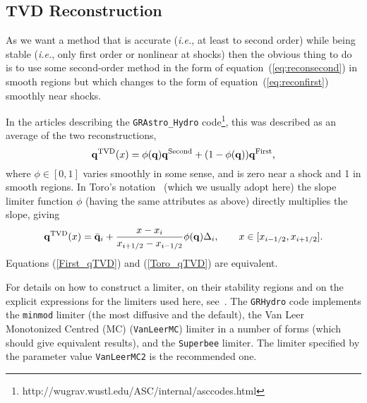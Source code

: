 \documentclass{article}
\begin{document}
\subsection{TVD Reconstruction}
\label{sec:tvd}

As we want a method that is accurate ({\it i.e.}, at least to second order)
while being stable ({\it i.e.}, only first order or nonlinear at shocks)
then the obvious thing to do is to use some second-order method in the
form of equation~(\ref{eq:reconsecond}) in smooth regions but which
changes to the form of equation~(\ref{eq:reconfirst}) smoothly near
shocks. 

In the articles describing the {\tt GRAstro\_Hydro}
code\footnote{http://wugrav.wustl.edu/ASC/internal/asccodes.html},
this was described as an average of the two reconstructions, 
\begin{equation}
  {\bf q}^{{\rm TVD}}(x) = \phi({\bf q}) {\bf q}^{{\rm Second}} + (1 -
  \phi({\bf q})) {\bf q}^{{\rm First}},
  \label{First_qTVD}
\end{equation}
where $\phi \in [0,1]$ varies smoothly in some sense, and is zero near
a shock and 1 in smooth regions. In Toro's notation~\cite{toro} (which we usually adopt here) 
the slope limiter function $\phi$ (having the same attributes as above)
directly multiplies the slope, giving
\begin{equation}
  {\bf q}^{{\rm TVD}}(x) = \bar{{\bf q}}_i + \frac{x -
  x_i}{x_{i+1/2} - x_{i-1/2}} \phi({\bf q}) \Delta_i, \qquad x \in [
  x_{i-1/2}, x_{i+1/2} ]. 
  \label{Toro_qTVD}
\end{equation}
Equations (\ref{First_qTVD}) and (\ref{Toro_qTVD}) are equivalent.

For details on how to construct a limiter, on their stability regions and on 
the explicit expressions for the limiters used here,
see~\cite{toro}. The {\tt GRHydro} code implements the {\tt minmod} limiter
(the most diffusive and the default), the Van Leer Monotonized Centred
(MC) ({\tt VanLeerMC}) limiter in a number of forms (which should give equivalent results), 
and the {\tt Superbee} limiter. The limiter specified by the parameter value {\tt VanLeerMC2} 
is the recommended one.
\end{document}

